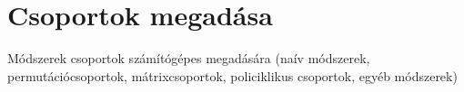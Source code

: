 \section{Csoportok megadása}
\label{sec:csoport}
Módszerek csoportok számítógépes megadására
(naív módszerek, permutációcsoportok, mátrixcsoportok, policiklikus csoportok, egyéb módszerek)


\clearpage

